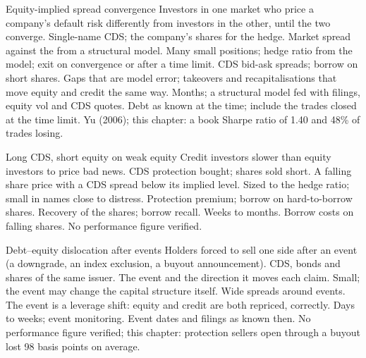 \begin{strategyfile}{Equity-implied spread convergence}\label{strat:s2:capital-structure-arbitrage:convergence}
 Investors in one market who price a company's default risk differently from investors in the other, until the two
converge.
 Single-name CDS; the company's shares for the hedge.
 Market spread against the  from a structural model.
 Many small positions; hedge ratio from the model; exit on convergence or after a time limit.
 CDS bid-ask spreads; borrow on short shares.
 Gaps that are model error; takeovers and recapitalisations that move equity and credit the same way.
 Months; a structural model fed with filings, equity vol and CDS quotes.
 Debt as known at the time; include the trades closed at the time limit.
 Yu (2006); this chapter: a book Sharpe ratio of 1.40 and 48\% of trades losing.
\end{strategyfile}

\begin{strategyfile}{Long CDS, short equity on weak equity}\label{strat:s2:capital-structure-arbitrage:weak}
 Credit investors slower than equity investors to price bad news.
 CDS protection bought; shares sold short.
 A falling share price with a CDS spread below its implied level.
 Sized to the hedge ratio; small in names close to distress.
 Protection premium; borrow on hard-to-borrow shares.
 Recovery of the shares; borrow recall.
 Weeks to months.
 Borrow costs on falling shares.
 No performance figure verified.
\end{strategyfile}

\begin{strategyfile}{Debt--equity dislocation after events}\label{strat:s2:capital-structure-arbitrage:events}
 Holders forced to sell one side after an event (a downgrade, an index exclusion, a buyout announcement).
 CDS, bonds and shares of the same issuer.
 The event and the direction it moves each claim.
 Small; the event may change the capital structure itself.
 Wide spreads around events.
 The event is a leverage shift: equity and credit are both repriced, correctly.
 Days to weeks; event monitoring.
 Event dates and filings as known then.
 No performance figure verified; this chapter: protection sellers open through a buyout lost 98 basis points on average.
\end{strategyfile}

